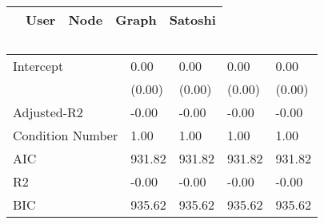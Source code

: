 \begin{table}
\caption{}
\begin{center}
\begin{tabular}{lcccc}
\hline
                 &  User  &  Node  & Graph  & Satoshi  \\
\hline
\hline
\end{tabular}
\begin{tabular}{lllll}
Intercept        & 0.00   & 0.00   & 0.00   & 0.00     \\
                 & (0.00) & (0.00) & (0.00) & (0.00)   \\
Adjusted-R2      & -0.00  & -0.00  & -0.00  & -0.00    \\
Condition Number & 1.00   & 1.00   & 1.00   & 1.00     \\
AIC              & 931.82 & 931.82 & 931.82 & 931.82   \\
R2               & -0.00  & -0.00  & -0.00  & -0.00    \\
BIC              & 935.62 & 935.62 & 935.62 & 935.62   \\
\hline
\end{tabular}
\end{center}
\end{table}